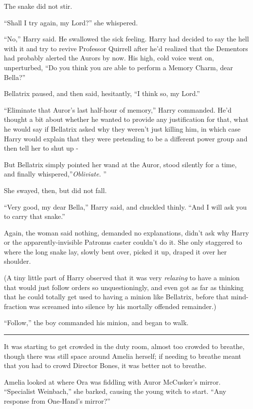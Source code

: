 The snake did not stir.

``Shall I try again, my Lord?'' she whispered.

``No,'' Harry said. He swallowed the sick feeling. Harry had decided to
say the hell with it and try to revive Professor Quirrell after he'd
realized that the Dementors had probably alerted the Aurors by now. His
high, cold voice went on, unperturbed, ``Do you think you are able to
perform a Memory Charm, dear Bella?''

Bellatrix paused, and then said, hesitantly, ``I think so, my Lord.''

``Eliminate that Auror's last half-hour of memory,'' Harry commanded.
He'd thought a bit about whether he wanted to provide any justification
for that, what he would say if Bellatrix asked why they weren't just
killing him, in which case Harry would explain that they were pretending
to be a different power group and then tell her to shut up -

But Bellatrix simply pointed her wand at the Auror, stood silently for a
time, and finally whispered,''\emph{Obliviate.} ''

She swayed, then, but did not fall.

``Very good, my dear Bella,'' Harry said, and chuckled thinly. ``And I
will ask you to carry that snake.''

Again, the woman said nothing, demanded no explanations, didn't ask why
Harry or the apparently-invisible Patronus caster couldn't do it. She
only staggered to where the long snake lay, slowly bent over, picked it
up, draped it over her shoulder.

(A tiny little part of Harry observed that it was very \emph{relaxing}
to have a minion that would just follow orders so unquestioningly, and
even got as far as thinking that he could totally get used to having a
minion like Bellatrix, before that mind-fraction was screamed into
silence by his mortally offended remainder.)

``Follow,'' the boy commanded his minion, and began to walk.

\begin{center}\rule{3in}{0.4pt}\end{center}

It was starting to get crowded in the duty room, almost too crowded to
breathe, though there was still space around Amelia herself; if needing
to breathe meant that you had to crowd Director Bones, it was better not
to breathe.

Amelia looked at where Ora was fiddling with Auror McCusker's mirror.
``Specialist Weinbach,'' she barked, causing the young witch to start.
``Any response from One-Hand's mirror?''

